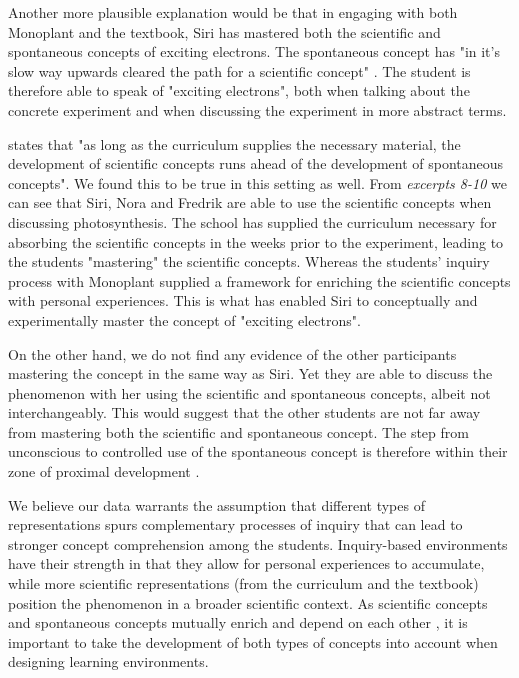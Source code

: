 Another more plausible explanation would be that in engaging with both Monoplant and the textbook, Siri has mastered both the scientific and spontaneous concepts of exciting electrons. The spontaneous concept has "in it's slow way upwards cleared the path for a scientific concept" \citep{vygotsky2012thought}. The student is therefore able to speak of "exciting electrons", both when talking about the concrete experiment and when discussing the experiment in more abstract terms. 

\citet{vygotsky2012thought} states that "as long as the curriculum supplies the necessary material, the development of scientific concepts runs ahead of the development of spontaneous concepts". We found this to be true in this setting as well. From \emph{excerpts 8-10} we can see that Siri, Nora and Fredrik are able to use the scientific concepts when discussing photosynthesis. The school has supplied the curriculum necessary for absorbing the scientific concepts in the weeks prior to the experiment, leading to the students "mastering" the scientific concepts. Whereas the students' inquiry process with Monoplant supplied a framework for enriching the scientific concepts with personal experiences. This is what has enabled Siri to conceptually and experimentally master the concept of "exciting electrons".  

On the other hand, we do not find any evidence of the other participants mastering the concept in the same way as Siri. Yet they are able to discuss the phenomenon with her using the scientific and spontaneous concepts, albeit not interchangeably. This would suggest that the other students are not far away from mastering both the scientific and spontaneous concept. The step from unconscious to controlled use of the spontaneous concept is therefore within their zone of proximal development \citep{vygotsky2012thought}. 

We believe our data warrants the assumption that different types of representations spurs complementary processes of inquiry that can lead to stronger concept comprehension among the students. Inquiry-based environments have their strength in that they allow for personal experiences to accumulate, while more scientific representations (from the curriculum and the textbook) position the phenomenon in a broader scientific context. As scientific concepts and spontaneous concepts mutually enrich and depend on each other \citep{vygotsky2012thought}, it is important to take the development of both types of concepts into account when designing learning environments. 

